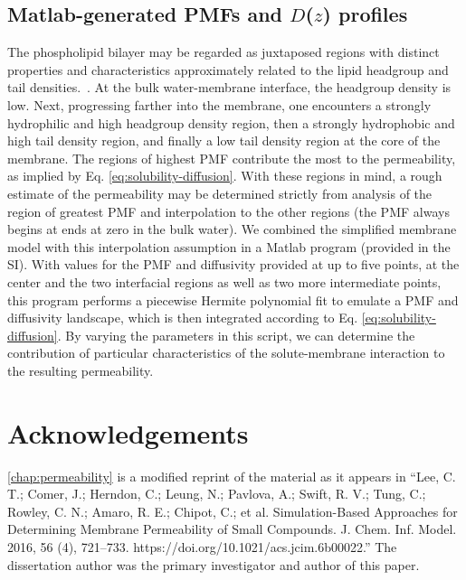 \subsection{Matlab-generated PMFs and $D$($z$) profiles}
\par The phospholipid bilayer may be regarded as juxtaposed regions with distinct properties and characteristics approximately related to the lipid headgroup and tail densities.~\cite{Marrink1994}. At the bulk water-membrane interface, the headgroup density is low. Next, progressing farther into the membrane, one encounters a strongly hydrophilic and high headgroup density region, then a strongly hydrophobic and high tail density region, and finally a low tail density region at the core of the membrane. The regions of highest PMF contribute the most to the permeability, as implied by Eq. \ref{eq:solubility-diffusion}. With these regions in mind, a rough estimate of the permeability may be determined strictly from analysis of the region of greatest PMF and interpolation to the other regions (the PMF always begins at ends at zero in the bulk water). We combined the simplified membrane model with this interpolation assumption in a Matlab program (provided in the SI). With values for the PMF and diffusivity provided at up to five points, at the center and the two interfacial regions as well as two more intermediate points, this program performs a piecewise Hermite polynomial fit to emulate a PMF and diffusivity landscape, which is then integrated according to Eq. \ref{eq:solubility-diffusion}. By varying the parameters in this script, we can determine the contribution of particular characteristics of the solute-membrane interaction to the resulting permeability.

\section{Acknowledgements}
\par \cref{chap:permeability} is a modified reprint of the material as it appears in ``Lee, C. T.; Comer, J.; Herndon, C.; Leung, N.; Pavlova, A.; Swift, R. V.; Tung, C.; Rowley, C. N.; Amaro, R. E.; Chipot, C.; et al. Simulation-Based Approaches for Determining Membrane Permeability of Small Compounds. J. Chem. Inf. Model. 2016, 56 (4), 721–733. https://doi.org/10.1021/acs.jcim.6b00022.''
The dissertation author was the primary investigator and author of this paper.

